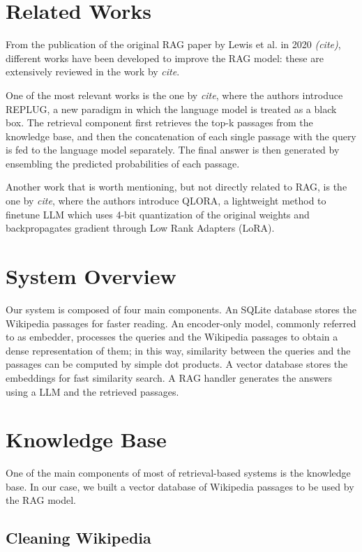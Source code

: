 \documentclass[11pt]{article}
\begin{document}
\section{Related Works}

From the publication of the original RAG paper by Lewis et al. in 2020 \textit{(cite)},
different works have been developed to improve the RAG model: these are extensively
reviewed in the work by \textit{cite}.

One of the most relevant works is the one by \textit{cite}, where the authors
introduce REPLUG, a new paradigm in which the language model is treated as a
black box. The retrieval component first retrieves the top-k passages from the
knowledge base, and then the concatenation of each single passage with the
query is fed to the language model separately. The final answer is then generated
by ensembling the predicted probabilities of each passage.

Another work that is worth mentioning, but not directly related to RAG, is the
one by \textit{cite}, where the authors introduce QLORA, a lightweight method 
to finetune LLM which uses 4-bit quantization of the original weights and backpropagates   
gradient through Low Rank Adapters (LoRA).

\section{System Overview}
Our system is composed of four main components.
An SQLite database stores the Wikipedia passages for faster reading.
An encoder-only model, commonly referred to as embedder, processes the queries and the Wikipedia passages to
obtain a dense representation of them; in this way, similarity between the queries and the passages can be computed
by simple dot products.
A vector database stores the embeddings for fast similarity search.
A RAG handler generates the answers using a LLM and the retrieved passages.


\section{Knowledge Base}

One of the main components of most of retrieval-based systems is the knowledge base.
In our case, we built a vector database of Wikipedia passages to be used by the RAG model.

\subsection{Cleaning Wikipedia}
\end{document}

